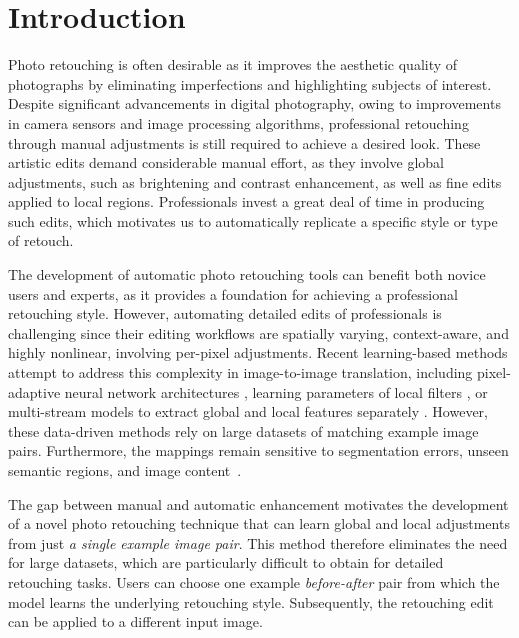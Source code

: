 \section{Introduction}\label{sec:introduction}

Photo retouching is often desirable as it improves the aesthetic quality of photographs by eliminating imperfections and \nobreak highlighting subjects of interest. Despite significant advancements in digital photography, owing to improvements in camera sensors and image processing algorithms, professional retouching through manual adjustments is still required to achieve a desired look. These artistic edits demand considerable manual effort, as they involve global adjustments, such as brightening and contrast enhancement, as well as fine edits applied to local regions. Professionals invest a great deal of time in producing such edits, which motivates us to automatically replicate a specific style or type of retouch.

The development of automatic photo retouching tools can benefit both novice users and experts, as it provides a foundation for achieving a professional retouching style. However, automating detailed edits of professionals is challenging since their editing workflows are spatially varying, context-aware, and highly nonlinear, involving per-pixel adjustments. Recent learning-based methods attempt to address this complexity in image-to-image translation, including pixel-adaptive neural network architectures \cite{shaham2021spatially, li2020lapar}, learning parameters of local filters \cite{moran2020deeplpf}, or multi-stream models to extract global and local features separately \cite{Gharbi17Deep}. However, these data-driven methods rely on large datasets of matching example image pairs. Furthermore, the mappings remain sensitive to segmentation errors, unseen semantic regions, and image content~\cite{yan2016automatic}.




The gap between manual and automatic enhancement motivates the development of a novel photo retouching technique that can learn global and local adjustments from just \emph{a single example image pair}. This method therefore eliminates the need for large datasets, which are particularly difficult to obtain for detailed retouching tasks. Users can choose one example \emph{before-after} pair from which the model learns the underlying retouching style. Subsequently, the retouching edit can be applied to a different input image.


